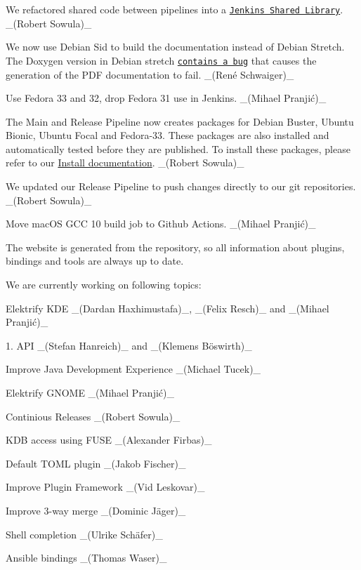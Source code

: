 \begin{DoxyItemize}
\item We refactored shared code between pipelines into a \href{https://github.com/ElektraInitiative/jenkins-library}{\tt Jenkins Shared Library}. \+\_\+(\+Robert Sowula)\+\_\+
\item We now use Debian Sid to build the documentation instead of Debian Stretch. The Doxygen version in Debian stretch \href{https://github.com/doxygen/doxygen/issues/6456}{\tt contains a bug} that causes the generation of the P\+DF documentation to fail. \+\_\+(René Schwaiger)\+\_\+
\item Use Fedora 33 and 32, drop Fedora 31 use in Jenkins. \+\_\+(Mihael Pranjić)\+\_\+
\item The Main and Release Pipeline now creates packages for Debian Buster, Ubuntu Bionic, Ubuntu Focal and Fedora-\/33. These packages are also installed and automatically tested before they are published. To install these packages, please refer to our \hyperlink{doc_INSTALL_md}{Install documentation}. \+\_\+(\+Robert Sowula)\+\_\+
\item We updated our Release Pipeline to push changes directly to our git repositories. \+\_\+(\+Robert Sowula)\+\_\+
\end{DoxyItemize}


\begin{DoxyItemize}
\item Move mac\+OS G\+CC 10 build job to Github Actions. \+\_\+(Mihael Pranjić)\+\_\+
\end{DoxyItemize}

The website is generated from the repository, so all information about plugins, bindings and tools are always up to date.

We are currently working on following topics\+:


\begin{DoxyItemize}
\item Elektrify K\+DE \+\_\+(\+Dardan Haxhimustafa)\+\_\+, \+\_\+(\+Felix Resch)\+\_\+ and \+\_\+(Mihael Pranjić)\+\_\+
\item 1. A\+PI \+\_\+(\+Stefan Hanreich)\+\_\+ and \+\_\+(Klemens Böswirth)\+\_\+
\item Improve Java Development Experience \+\_\+(\+Michael Tucek)\+\_\+
\item Elektrify G\+N\+O\+ME \+\_\+(Mihael Pranjić)\+\_\+
\item Continious Releases \+\_\+(\+Robert Sowula)\+\_\+
\item K\+DB access using F\+U\+SE \+\_\+(\+Alexander Firbas)\+\_\+
\item Default T\+O\+ML plugin \+\_\+(\+Jakob Fischer)\+\_\+
\item Improve Plugin Framework \+\_\+(\+Vid Leskovar)\+\_\+
\item Improve 3-\/way merge \+\_\+(Dominic Jäger)\+\_\+
\item Shell completion \+\_\+(Ulrike Schäfer)\+\_\+
\item Ansible bindings \+\_\+(\+Thomas Waser)\+\_\+
\end{DoxyItemize}

